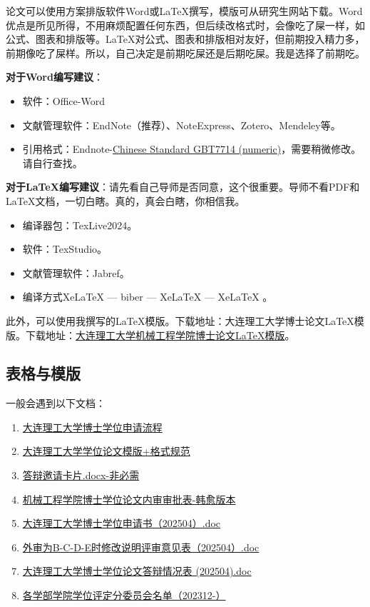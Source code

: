 \documentclass[12pt,a4paper]{ctexart}
\begin{document}
论文可以使用方案排版软件Word或\LaTeX 撰写，模版可从研究生网站下载。Word优点是所见所得，不用麻烦配置任何东西，但后续改格式时，会像吃了屎一样，如公式、图表和排版等。\LaTeX 对公式、图表和排版相对友好，但前期投入精力多，前期像吃了屎样。所以，自己决定是前期吃屎还是后期吃屎。我是选择了前期吃。

\textbf{对于Word编写建议}：
\begin{itemize}
\item 软件：Office-Word
\item 文献管理软件：EndNote（推荐）、NoteExpress、Zotero、Mendeley等。
\item 引用格式：Endnote-\href{https://endnote.com/downloads/styles/chinese-standard-gb-t7714-numeric/?srsltid=AfmBOor20AgTDOjwFDm6fJqbAP8A6gGHeKBfwV-UuxWS9wOtau8e8W6M}{Chinese Standard GBT7714 (numeric)}，需要稍微修改。请自行查找。
 \end{itemize}

  \textbf{对于\LaTeX 编写建议}：请先看自己导师是否同意，这个很重要。导师不看PDF和\LaTeX 文档，一切白瞎。真的，真会白瞎，你相信我。
  \begin{itemize}
    \item 编译器包：TexLive2024。
\item 软件：TexStudio。
\item 文献管理软件：Jabref。
\item 编译方式XeLaTeX ---  biber ---  XeLaTeX --- XeLaTeX 。
 \end{itemize}

 
 此外，可以使用我撰写的\LaTeX 模版。下载地址：大连理工大学博士论文\LaTeX 模版。下载地址：\href{https://github.com/DrHanks91/DUT_PhD_Thesis_Template}{大连理工大学机械工程学院博士论文LaTeX模版}。
 

 \subsection{表格与模版}
 \label{sec:listRequire}

一般会遇到以下文档：
 \begin{enumerate}
   \item \href{https://gs.dlut.edu.cn/info/1207/3994.htm}{大连理工大学博士学位申请流程}
 \item \href{https://gs.dlut.edu.cn/info/1210/13916.htm}{大连理工大学学位论文模版+格式规范}
\item \href{https://github.com/DrHanks91/DUTMePhDProcess}{答辩邀请卡片.docx-非必需}   
 \item \href{https://github.com/DrHanks91/DUTMePhDProcess}{机械工程学院博士学位论文内审审批表-韩愈版本}
 \item \href{https://gs.dlut.edu.cn/info/1207/8541.htm}{大连理工大学博士学位申请书（202504）.doc}
 \item \href{https://gs.dlut.edu.cn/info/1207/8541.htm}{外审为B-C-D-E时修改说明评审意见表（202504）.doc}
 \item \href{https://gs.dlut.edu.cn/info/1207/8541.htm}{大连理工大学博士学位论文答辩情况表 (202504).doc}
 \item \href{https://gs.dlut.edu.cn/info/1209/13422.htm}{各学部学院学位评定分委员会名单（202312-）}
 \end{enumerate}
\end{document}
